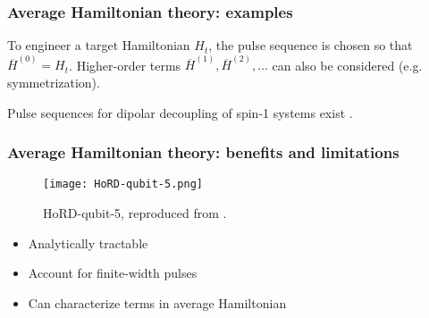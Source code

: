 \documentclass{beamer}
\begin{document}
\begin{frame}
\frametitle{Average Hamiltonian theory: examples}

To engineer a target Hamiltonian $H_t$, the pulse sequence is chosen so that $\overline{H}^{(0)} = H_t$. Higher-order terms $\overline{H}^{(1)}, \overline{H}^{(2)}, \dots$ can also be considered (e.g. symmetrization).

\begin{table}
\centering
{}
\end{table}


Pulse sequences for dipolar decoupling of spin-1 systems exist \cite{PhysRevLett.119.183603, O_Keeffe_2019}.

\end{frame}

\begin{frame}
\frametitle{Average Hamiltonian theory: benefits and limitations}

\begin{figure}
    \centering
    \texttt{[image: HoRD-qubit-5.png]}
    \caption{HoRD-qubit-5, reproduced from \cite{O_Keeffe_2019}.}
    \label{fig:HoRD_qubit_5}
\end{figure}

\begin{itemize}
    \item Analytically tractable
    \item Account for finite-width pulses
    \item Can characterize terms in average Hamiltonian
    \pause
    \color{red}{
    \item Only tractable for lowest-order terms
    \item Enforced structure on pulse sequences
    }
\end{itemize}

\end{frame}
\end{document}
